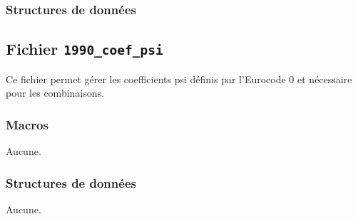 \documentclass{article}
\begin{document}
\subsubsection{Structures de données}























\subsection{Fichier {\texttt{1990\_coef\_psi}}}
Ce fichier permet gérer les coefficients psi définis par l'Eurocode 0 et nécessaire pour les combinaisons.
\subsubsection{Macros}
Aucune.
\subsubsection{Structures de données}
Aucune.


















\end{document}
